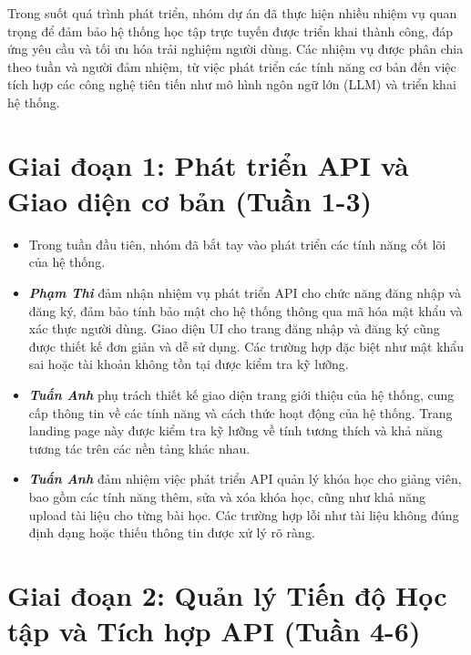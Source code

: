 
Trong suốt quá trình phát triển, nhóm dự án đã thực hiện nhiều nhiệm vụ quan trọng để đảm bảo hệ thống học tập trực tuyến được triển khai thành công, đáp ứng yêu cầu và tối ưu hóa trải nghiệm người dùng. Các nhiệm vụ được phân chia theo tuần và người đảm nhiệm, từ việc phát triển các tính năng cơ bản đến việc tích hợp các công nghệ tiên tiến như mô hình ngôn ngữ lớn (LLM) và triển khai hệ thống.

\section{Giai đoạn 1: Phát triển API và Giao diện cơ bản (Tuần 1-3)}

\begin{itemize}[label=-]
    \item Trong tuần đầu tiên, nhóm đã bắt tay vào phát triển các tính năng cốt lõi của hệ thống. 
    \item \textbf{\textit{Phạm Thi}} đảm nhận nhiệm vụ phát triển API cho chức năng đăng nhập và đăng ký, đảm bảo tính bảo mật cho hệ thống thông qua mã hóa mật khẩu và xác thực người dùng. Giao diện UI cho trang đăng nhập và đăng ký cũng được thiết kế đơn giản và dễ sử dụng. Các trường hợp đặc biệt như mật khẩu sai hoặc tài khoản không tồn tại được kiểm tra kỹ lưỡng.
    \item \textbf{\textit{Tuấn Anh}} phụ trách thiết kế giao diện trang giới thiệu của hệ thống, cung cấp thông tin về các tính năng và cách thức hoạt động của hệ thống. Trang landing page này được kiểm tra kỹ lưỡng về tính tương thích và khả năng tương tác trên các nền tảng khác nhau.
    \item \textbf{\textit{Tuấn Anh}} đảm nhiệm việc phát triển API quản lý khóa học cho giảng viên, bao gồm các tính năng thêm, sửa và xóa khóa học, cũng như khả năng upload tài liệu cho từng bài học. Các trường hợp lỗi như tài liệu không đúng định dạng hoặc thiếu thông tin được xử lý rõ ràng.
\end{itemize}

\section{Giai đoạn 2: Quản lý Tiến độ Học tập và Tích hợp API (Tuần 4-6)}


